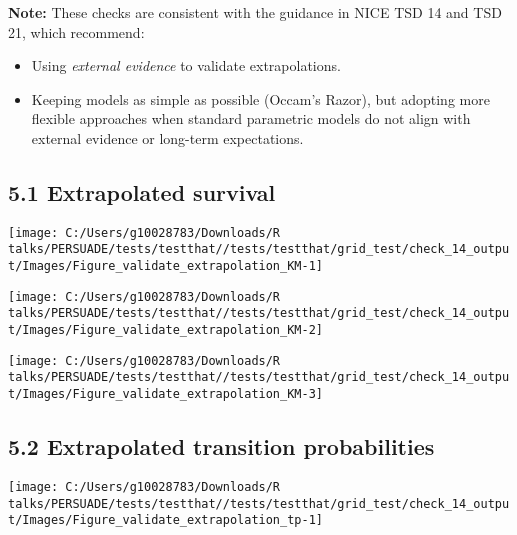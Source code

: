\documentclass[
]{article}
\providecommand{\tightlist}{%
  \setlength{\itemsep}{0pt}\setlength{\parskip}{0pt}}
\begin{document}
\textbf{Note:} These checks are consistent with the guidance in NICE TSD
14 and TSD 21, which recommend:

\begin{itemize}
\tightlist
\item
  Using \emph{external evidence} to validate extrapolations.\\
\item
  Keeping models as simple as possible (Occam's Razor), but adopting
  more flexible approaches when standard parametric models do not align
  with external evidence or long-term expectations.
\end{itemize}

\subsection{5.1 Extrapolated survival}\label{extrapolated-survival}

\begin{flushleft}\texttt{[image: C:/Users/g10028783/Downloads/R talks/PERSUADE/tests/testthat//tests/testthat/grid\_test/check\_14\_output/Images/Figure\_validate\_extrapolation\_KM-1]} \end{flushleft}

\begin{flushleft}\texttt{[image: C:/Users/g10028783/Downloads/R talks/PERSUADE/tests/testthat//tests/testthat/grid\_test/check\_14\_output/Images/Figure\_validate\_extrapolation\_KM-2]} \end{flushleft}

\begin{flushleft}\texttt{[image: C:/Users/g10028783/Downloads/R talks/PERSUADE/tests/testthat//tests/testthat/grid\_test/check\_14\_output/Images/Figure\_validate\_extrapolation\_KM-3]} \end{flushleft}

\clearpage

\subsection{5.2 Extrapolated transition
probabilities}\label{extrapolated-transition-probabilities}

\begin{flushleft}\texttt{[image: C:/Users/g10028783/Downloads/R talks/PERSUADE/tests/testthat//tests/testthat/grid\_test/check\_14\_output/Images/Figure\_validate\_extrapolation\_tp-1]} \end{flushleft}
\end{document}

